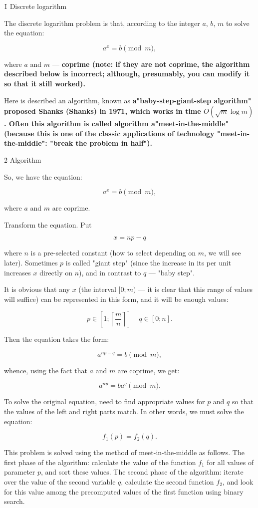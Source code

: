 \h1{ Discrete logarithm }

The discrete logarithm problem is that, according to the integer $a$, $b$, $m$ to solve the equation:

$$ a^x = b \pmod m, $$

where $a$ and $m$ --- \bf{coprime} (note: if they are not coprime, the algorithm described below is incorrect; although, presumably, you can modify it so that it still worked).

Here is described an algorithm, known as \bf {a"baby-step-giant-step algorithm"} proposed \bf{Shanks (Shanks)} in 1971, which works in time $O (\sqrt{m} \log m)$. Often this algorithm is called algorithm \bf {a"meet-in-the-middle"} (because this is one of the classic applications of technology "meet-in-the-middle": "break the problem in half").


\h2{ Algorithm }

So, we have the equation:

$$ a^x = b \pmod m, $$

where $a$ and $m$ are coprime.

Transform the equation. Put

$$ x = np - q $$

where $n$ is a pre-selected constant (how to select depending on $m$, we will see later). Sometimes $p$ is called "giant step" (since the increase in its per unit increases $x$ directly on $n$), and in contrast to $q$ --- "baby step".

It is obvious that any $x$ (the interval $[0;m)$ --- it is clear that this range of values will suffice) can be represented in this form, and it will be enough values:

$$ p \in \left[ 1; \left\lceil \frac{m}{n} \right\rceil \right]~~~~~ q \in [0;n]. $$

Then the equation takes the form:

$$ a^{np-q} = b \pmod m, $$

whence, using the fact that $a$ and $m$ are coprime, we get:

$$ a^{np} = b a^q \pmod m. $$

To solve the original equation, need to find appropriate values for $p$ and $q$ so that the values of the left and right parts match. In other words, we must solve the equation:

$$ f_1(p) = f_2(q). $$

This problem is solved using the method of meet-in-the-middle as follows. The first phase of the algorithm: calculate the value of the function $f_1$ for all values of parameter $p$, and sort these values. The second phase of the algorithm: iterate over the value of the second variable $q$, calculate the second function $f_2$, and look for this value among the precomputed values of the first function using binary search.


